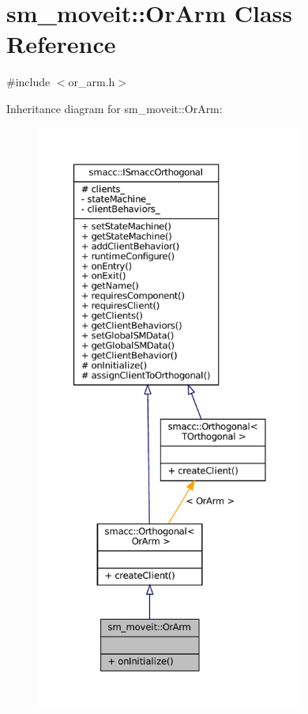 \hypertarget{classsm__moveit_1_1OrArm}{}\section{sm\+\_\+moveit\+:\+:Or\+Arm Class Reference}
\label{classsm__moveit_1_1OrArm}


{\ttfamily \#include $<$or\+\_\+arm.\+h$>$}



Inheritance diagram for sm\+\_\+moveit\+:\+:Or\+Arm\+:
\nopagebreak
\begin{figure}[H]
\begin{center}
\leavevmode
\includegraphics[height=550pt]{classsm__moveit_1_1OrArm__inherit__graph}
\end{center}
\end{figure}


